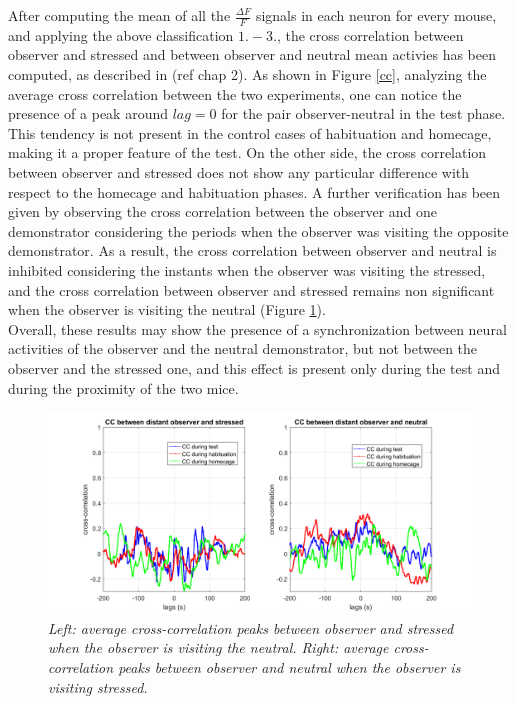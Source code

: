 \documentclass[12pt, a4paper]{report}
\begin{document}
After computing the mean of all the $\frac{\Delta F}{F}$ signals in each neuron for every mouse, and applying the above classification $1.-3.$, the cross correlation between observer and stressed and between observer and neutral mean activies has been computed, as described in (ref chap 2). As shown in Figure \ref*{cc}, analyzing the average cross correlation between the two experiments, one can notice the presence of a peak around $ lag=0 $ for the pair observer-neutral in the test phase. This tendency is not present in the control cases of habituation and homecage, making it a proper feature of the test. On the other side, the cross correlation between observer and stressed does not show any particular difference with respect to the homecage and habituation phases. A further verification has been given by observing the cross correlation between the observer and one demonstrator considering the periods when the observer was visiting the opposite demonstrator. As a result, the cross correlation between observer and neutral is inhibited considering the instants when the observer was visiting the stressed, and the cross correlation between observer and stressed remains non significant when the observer is visiting the neutral (Figure \ref{distant}).\\
 Overall, these results may show the presence of a synchronization between neural activities of the observer and the neutral demonstrator, but not between the observer and the stressed one, and this effect is present only during the test and during the proximity of the two mice.

\begin{figure}[H]
	
	\begin{center}
		\hspace*{-1.4cm}
		\includegraphics[scale=.5]{cc_distant.png} 
	\end{center} 
	\caption{\textit{Left: average cross-correlation peaks between observer and stressed when the observer is visiting the neutral. Right: average cross-correlation peaks between observer and neutral when the observer is visiting stressed.}} \label{distant}
	
\end{figure}
\end{document}

